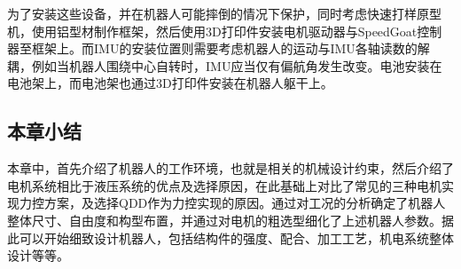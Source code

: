 为了安装这些设备，并在机器人可能摔倒的情况下保护，同时考虑快速打样原型机，使用铝型材制作框架，然后使用3D打印件安装电机驱动器与SpeedGoat控制器至框架上。而IMU的安装位置则需要考虑机器人的运动与IMU各轴读数的解耦，例如当机器人围绕中心自转时，IMU应当仅有偏航角发生改变。电池安装在电池架上，而电池架也通过3D打印件安装在机器人躯干上。

\subsection{本章小结}

本章中，首先介绍了机器人的工作环境，也就是相关的机械设计约束，然后介绍了电机系统相比于液压系统的优点及选择原因，在此基础上对比了常见的三种电机实现力控方案，及选择QDD作为力控实现的原因。通过对工况的分析确定了机器人整体尺寸、自由度和构型布置，并通过对电机的粗选型细化了上述机器人参数。据此可以开始细致设计机器人，包括结构件的强度、配合、加工工艺，机电系统整体设计等等。